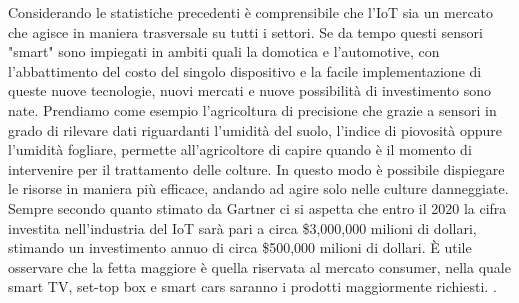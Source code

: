 Considerando le statistiche precedenti è comprensibile che l'IoT sia un
mercato che agisce in maniera trasversale su tutti i settori. Se da tempo questi
sensori "smart" sono impiegati in ambiti quali la domotica e l'automotive,
con l'abbattimento del costo del
singolo  dispositivo e la facile implementazione di queste nuove tecnologie,  nuovi
mercati e nuove possibilità di investimento sono nate. Prendiamo come esempio
l'agricoltura di precisione che grazie a sensori in grado di rilevare dati
riguardanti l'umidità del suolo, l'indice di piovosità oppure l'umidità fogliare,
permette all'agricoltore di  capire quando è il momento di intervenire per il
trattamento delle colture. In questo modo è possibile dispiegare le risorse in
maniera più efficace, andando ad agire solo nelle culture danneggiate.
Sempre secondo quanto stimato da Gartner ci si aspetta che entro il 2020 
la cifra investita nell'industria del IoT
sarà pari a circa \$3,000,000 milioni di dollari, stimando un investimento annuo di
circa \$500,000 milioni di dollari. È utile osservare che la fetta maggiore è quella
riservata al mercato consumer, nella quale smart TV, set-top box e smart cars
saranno i prodotti
maggiormente richiesti.
\cite{gartner2016}. 



